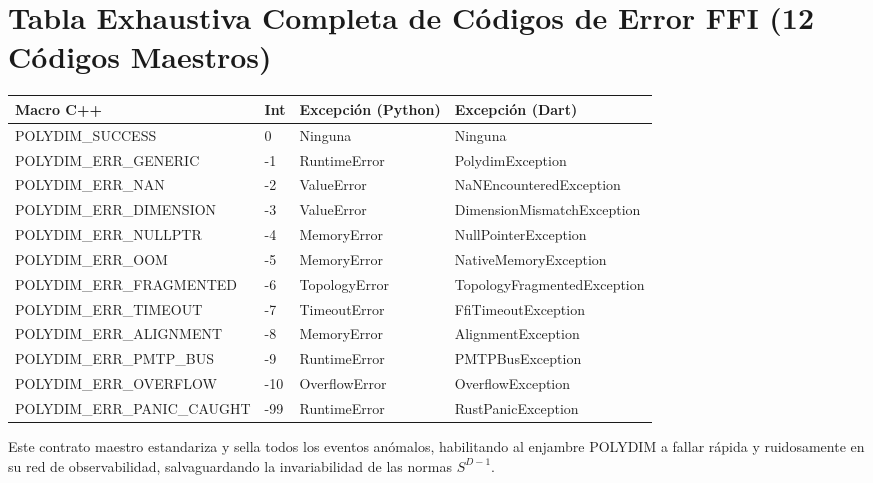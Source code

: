 \section{Tabla Exhaustiva Completa de Códigos de Error FFI (12 Códigos Maestros)}
\begin{table}[h]
\centering
\begin{tabular}{|l|l|p{4cm}|p{4cm}|}
\hline
\textbf{Macro C++} & \textbf{Int} & \textbf{Excepción (Python)} & \textbf{Excepción (Dart)} \\ \hline
POLYDIM\_SUCCESS             & 0   & Ninguna                     & Ninguna \\ \hline
POLYDIM\_ERR\_GENERIC        & -1  & RuntimeError                & PolydimException \\ \hline
POLYDIM\_ERR\_NAN            & -2  & ValueError                  & NaNEncounteredException \\ \hline
POLYDIM\_ERR\_DIMENSION      & -3  & ValueError                  & DimensionMismatchException \\ \hline
POLYDIM\_ERR\_NULLPTR        & -4  & MemoryError                 & NullPointerException \\ \hline
POLYDIM\_ERR\_OOM            & -5  & MemoryError                 & NativeMemoryException \\ \hline
POLYDIM\_ERR\_FRAGMENTED     & -6  & TopologyError               & TopologyFragmentedException \\ \hline
POLYDIM\_ERR\_TIMEOUT        & -7  & TimeoutError                & FfiTimeoutException \\ \hline
POLYDIM\_ERR\_ALIGNMENT      & -8  & MemoryError                 & AlignmentException \\ \hline
POLYDIM\_ERR\_PMTP\_BUS      & -9  & RuntimeError                & PMTPBusException \\ \hline
POLYDIM\_ERR\_OVERFLOW       & -10 & OverflowError               & OverflowException \\ \hline
POLYDIM\_ERR\_PANIC\_CAUGHT  & -99 & RuntimeError                & RustPanicException \\ \hline
\end{tabular}
\end{table}

Este contrato maestro estandariza y sella todos los eventos anómalos, habilitando al enjambre POLYDIM a fallar rápida y ruidosamente en su red de observabilidad, salvaguardando la invariabilidad de las normas $S^{D-1}$.
